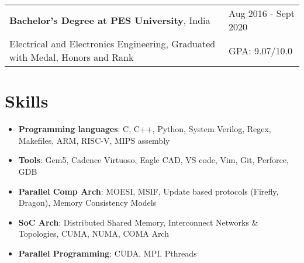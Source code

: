 \documentclass[a4paper,10pt]{article}
\begin{document}
\begin{tabularx}{\linewidth}{ @{}l X@{} }
    \textbf{Bachelor's Degree at PES University}, India & \hfill {\small Aug 2016 - Sept 2020} \\[2.75pt]
    {\small Electrical and Electronics Engineering, Graduated with Medal, Honors and Rank} & \hfill {\small GPA: 9.07/10.0}
\end{tabularx}

\vspace{-0.1cm}
\section{Skills}

\begin{minipage}[t]{\linewidth}
    \begin{itemize}[nosep, leftmargin=2em, itemsep=3pt]
        \item \textbf{Programming languages}: C, C++, Python, System Verilog, Regex, Makefiles, ARM, RISC-V, MIPS assembly
        \item \textbf{Tools}: Gem5, Cadence Virtuoso, Eagle CAD, VS code, Vim, Git, Perforce, GDB
        \item \textbf{Parallel Comp Arch}: MOESI, MSIF, Update based protocols (Firefly, Dragon), Memory Consistency Models
        \item \textbf{SoC Arch}: Distributed Shared Memory, Interconnect Networks \& Topologies, CUMA, NUMA, COMA Arch
        \item \textbf{Parallel Programming}: CUDA, MPI, Pthreads
        
    \end{itemize}
\end{minipage} 

\vspace{-0.1cm}
\end{document}
